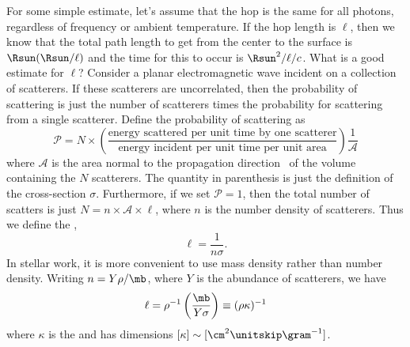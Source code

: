 For some simple estimate, let's assume that the hop is the same for all photons, regardless of frequency or ambient temperature. If the hop length is $\ell$, then we know that the total path length to get from the center to the surface is $\Rsun(\Rsun/\ell)$ and the time for this to occur is $\Rsun^{2}/\ell/c$. What is a good estimate for $\ell$?  Consider a planar electromagnetic wave incident on a collection of scatterers. If these scatterers are uncorrelated, then the probability of scattering is just the number of scatterers times the probability for scattering from a single scatterer.  Define the probability of scattering as
\begin{equation}\label{e.scattering-probability}
\mathcal{P} = N\times\left(\frac{\textrm{energy scattered per unit time by one scatterer}}{\textrm{energy incident per unit time per unit area}}\right)\frac{1}{ \mathcal{A}}
\end{equation}
where $\mathcal{A}$ is the area normal to the propagation direction \unitk\ of the volume containing the $N$ scatterers.  The quantity in parenthesis is just the definition of the cross-section $\sigma$. Furthermore, if we set $\mathcal{P} = 1$, then the total number of scatters is just $N = n\times \mathcal{A}\times \ell$, where $n$ is the number density of scatterers. Thus we define the ,
\begin{equation}\label{e.mean-free-path}
\ell = \frac{1}{n\sigma}.
\end{equation}
In stellar work, it is more convenient to use mass density rather than number density.  Writing $n = Y\rho/\mb$, where $Y$ is the abundance of scatterers, we have
\[ \ell = \rho^{-1} \left(\frac{\mb}{Y\sigma}\right) \equiv (\rho\kappa)^{-1} \]
where $\kappa$ is the  and has dimensions $[\kappa]\sim[\cm^{2}\nsp\gram^{-1}]$.

